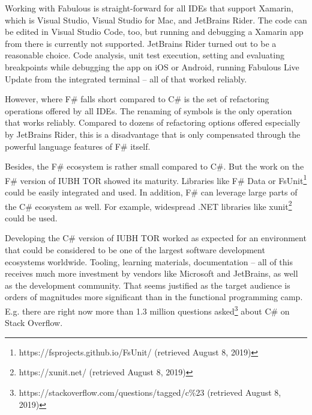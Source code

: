 Working with Fabulous is straight-forward for all IDEs that support Xamarin, which is Visual Studio, Visual Studio for Mac, and JetBrains Rider. The code can be edited in Visual Studio Code, too, but running and debugging a Xamarin app from there is currently not supported. JetBrains Rider turned out to be a reasonable choice. Code analysis, unit test execution, setting and evaluating breakpoints while debugging the app on iOS or Android, running Fabulous Live Update from the integrated terminal – all of that worked reliably. 

However, where F\# falls short compared to C\# is the set of refactoring operations offered by all IDEs. The renaming of symbols is the only operation that works reliably. Compared to dozens of refactoring options offered especially by JetBrains Rider, this is a disadvantage that is only compensated through the powerful language features of F\# itself. 

Besides, the F\# ecosystem is rather small compared to C\#. But the work on the F\# version of IUBH TOR showed its maturity. Libraries like F\# Data or FsUnit\footnote{https://fsprojects.github.io/FsUnit/ (retrieved August 8, 2019)} could be easily integrated and used. In addition, F\# can leverage large parts of the C\# ecosystem as well. For example, widespread .NET libraries like xunit\footnote{https://xunit.net/ (retrieved August 8, 2019)} could be used.

Developing the C\# version of IUBH TOR worked as expected for an environment that could be considered to be one of the largest software development ecosystems worldwide. Tooling, learning materials, documentation – all of this receives much more investment by vendors like Microsoft and JetBrains, as well as the development community. That seems justified as the target audience is orders of magnitudes more significant than in the functional programming camp. E.g. there are right now more than 1.3 million questions asked\footnote{https://stackoverflow.com/questions/tagged/c\%23 (retrieved August 8, 2019)} about C\# on Stack Overflow. 
